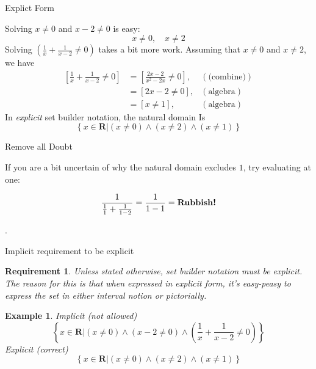 \documentclass[usenames,dvipsnames,fleqn,leqno,10pt, pdflatex]{beamer}
\newcommand{\reals}{\mathbf{R}}
\newtheorem{require}{Requirement}
\newtheorem{myexample}{Example}
\begin{document}
\begin{frame}{Explict Form}

Solving $ x \neq 0$ and $x-2 \neq 0$ is easy:
\[ 
    x \neq 0, \quad x \neq 2
\]
Solving \(\left(\frac{1}{x} + \frac{1}{x-2} \neq 0 \right) \) takes
a bit more work. Assuming that $x \neq 0$ and $x \neq 2$, we have
\begin{align*}
    \left[\frac{1}{x} + \frac{1}{x-2} \neq 0 \right] 
       &= \left[\frac{2 x-2}{{{x}^{2}}-2 x} \neq 0 \right],  &(\mbox{(combine)})\\
       &= \left[2 x-2 \neq 0 \right], &(\mbox{algebra}) \\
       &=  \left[x  \neq 1 \right], &(\mbox{algebra})
\end{align*}
In \emph{explicit} set builder notation, the natural domain Is\
\begin{equation*}
    \left\{ x \in \reals \bigg | \left(x \neq 0\right)  
    \land \left(x  \neq 2 \right) \land  
    \left(x \neq 1 \right) \right\}
\end{equation*}
\end{frame}

\begin{frame}{Remove all Doubt}

If you are a bit uncertain of why the natural domain excludes $1$,
try evaluating at one:

\begin{equation*}
    \frac{1}{\frac{1}{1} + \frac{1}{1-2}} = \frac{1}{1 - 1} =
    \mbox{\textbf{Rubbish!}}
\end{equation*}

\vfill.
\end{frame}


\begin{frame}{Implicit requirement to be explicit}

    \begin{require} Unless stated otherwise, set builder notation
        must be explicit. The reason for this is that when expressed
        in explicit form, it's easy-peasy to express the set in either
        interval notion or pictorially.
    \end{require}
    
    \begin{myexample} Implicit (not allowed)
        \begin{equation*}
            \left\{ x \in \reals \bigg | \left(x \neq 0 \right)  
            \land \left(x-2 \neq 0 \right) \land  
            \left(\frac{1}{x} + \frac{1}{x-2} \neq 0 \right) \right\}
        \end{equation*}
    Explicit (correct)
    \begin{equation*}
        \left\{ x \in \reals \bigg | \left(x \neq 0\right)  
        \land \left(x  \neq 2 \right) \land  
        \left(x \neq 1 \right) \right\}
    \end{equation*}
    \end{myexample}
    
        
    \end{frame}
 
\end{document}

